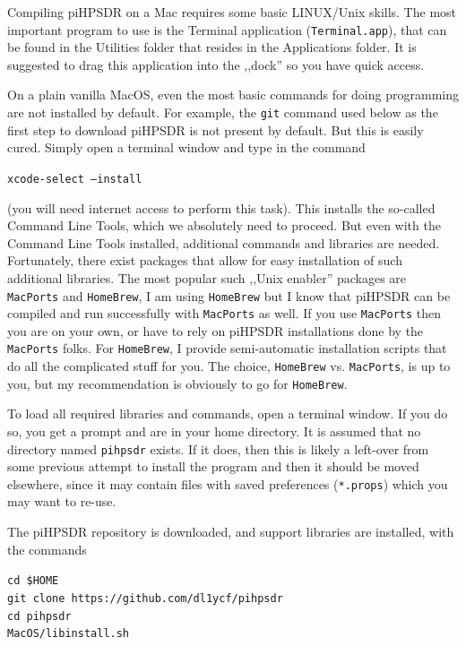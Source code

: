 \documentclass[12pt]{book}
\def\grtt#1{\texttt{\color{magenta}#1}}
\def\pH{pi\-HPSDR\xspace}
\begin{document}
Compiling \pH on a Mac requires some basic LINUX/Unix skills. The most important program to use is
the Terminal application (\texttt{Terminal.app}), that can be found in the Utilities folder that resides
in the Applications folder. It is suggested to drag this application into the ,,dock'' so you have quick
access.

On a plain vanilla MacOS, even the most basic commands for doing programming are not installed
by default. For example, the \grtt{git} command used below as the first step  to download \pH is
not present by default. But this is easily cured. Simply open a terminal window and type in the command

\grtt{xcode-select --install}

(you will need internet access to perform this task). This installs the so-called Command Line Tools,
which we absolutely need to proceed. But even with the Command Line Tools installed, additional
commands and libraries are needed. Fortunately, there exist packages that allow for easy installation
of such additional libraries.
The most popular such ,,Unix enabler'' packages are \texttt{MacPorts} and \texttt{HomeBrew}, I
am using
\texttt{HomeBrew} but I know that \pH can be compiled and run successfully with \texttt{MacPorts}
as well. If you use \texttt{MacPorts} then you are on your own, or
have to rely on \pH installations done by the \texttt{MacPorts} folks. For \texttt{HomeBrew},
I provide semi-automatic installation scripts that do all the complicated stuff for you. The choice,
\texttt{HomeBrew} vs. \texttt{MacPorts}, is up to you, but my recommendation is obviously
to go for \texttt{HomeBrew}.

To load all required libraries and commands, open a terminal window. If you do so, you get
a prompt and are in your home directory. It is assumed that no directory named \texttt{pihpsdr}
exists. If it does, then this is likely a left-over from some previous
attempt to install the program and then it should be moved elsewhere, since it may contain
files with saved preferences (\texttt{*.props}) which you may want to re-use.

The \pH repository is downloaded, and support libraries are installed, with the commands

\grtt{cd \$HOME} \\
\grtt{git clone https://github.com/dl1ycf/pihpsdr} \\
\grtt{cd pihpsdr} \\
\grtt{MacOS/libinstall.sh} \\
\end{document}

